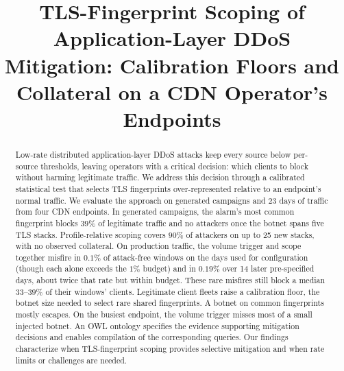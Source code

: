 \documentclass[conference,letterpaper,10pt]{IEEEtran}
\newcommand\1{\textit{(i)}}
\newcommand\2{\textit{(ii)}}
\newcommand\3{\textit{(iii)}}
\newcommand\4{\textit{(iv)}}
\newcommand\5{\textit{(v)}}
\newcommand\6{\textit{(vi)}}
\newcommand\7{\textit{(vii)}}
\newcommand\8{\textit{(viii)}}
\newcommand\9{\textit{(ix)}}
\begin{document}
\title{TLS-Fingerprint Scoping of Application-Layer DDoS Mitigation: Calibration Floors and Collateral on a CDN Operator's Endpoints}

\author{
}

\maketitle

\begin{abstract}
Low-rate distributed application-layer DDoS attacks keep
every source below per-source thresholds, leaving operators
with a critical decision:
which clients to block without harming legitimate traffic.
We address this decision through a calibrated statistical test
that selects TLS fingerprints over-represented relative to an
endpoint's normal traffic. We evaluate the approach on generated
campaigns and 23 days of traffic from four CDN endpoints.
In generated campaigns, the alarm's most common fingerprint
blocks $39\%$ of legitimate traffic and no attackers once
the
botnet spans five TLS stacks. Profile-relative scoping
covers $90\%$ of attackers on up to 25 new stacks, with no
observed collateral. On production traffic, the volume
trigger and scope together misfire in $0.1\%$ of attack-free
windows on the days used for configuration (though each
alone exceeds the $1\%$ budget) and in $0.19\%$ over 14
later pre-specified days, about twice that rate but within
budget.
These rare misfires still block a median $33$--$39\%$ of
their windows' clients. Legitimate client fleets raise a
calibration floor, the botnet size needed to select rare
shared
fingerprints. A botnet on common fingerprints mostly
escapes. On the busiest endpoint,
the volume trigger misses most of a small injected botnet.
An OWL ontology specifies the evidence supporting mitigation
decisions and enables compilation of the corresponding queries.
Our findings characterize when TLS-fingerprint scoping provides
selective mitigation and when rate limits or challenges are needed.
\end{abstract}
\end{document}
